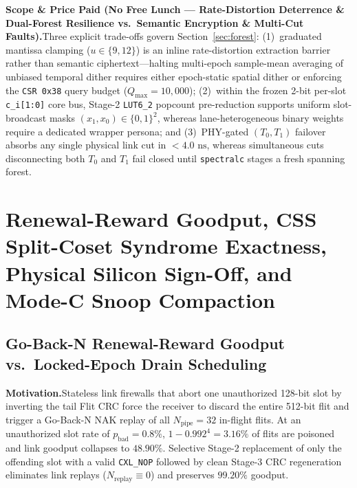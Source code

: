\documentclass[11pt,letterpaper]{article}
\theoremstyle{spectralthm}
\begin{document}
\noindent\textbf{Scope \& Price Paid (No Free Lunch --- Rate-Distortion Deterrence \& Dual-Forest Resilience vs.\ Semantic Encryption \& Multi-Cut Faults).}\;Three explicit trade-offs govern Section~\ref{sec:forest}: (1)~graduated mantissa clamping ($u \in \{9,12\}$) is an inline rate-distortion extraction barrier rather than semantic ciphertext---halting multi-epoch sample-mean averaging of unbiased temporal dither requires either epoch-static spatial dither or enforcing the \texttt{CSR 0x38} query budget ($Q_{\max} = 10,000$); (2)~within the frozen 2-bit per-slot \texttt{c\_i[1:0]} core bus, Stage-2 \mbox{\texttt{LUT6\_2}} popcount pre-reduction supports uniform slot-broadcast masks $(x_1,x_0) \in \{0,1\}^2$, whereas lane-heterogeneous binary weights require a dedicated wrapper persona; and (3)~PHY-gated $(T_0,T_1)$ failover absorbs any single physical link cut in $<4.0\text{~ns}$, whereas simultaneous cuts disconnecting both $T_0$ and $T_1$ fail closed until \texttt{spectralc} stages a fresh spanning forest.

\section{Renewal-Reward Goodput, CSS Split-Coset Syndrome Exactness, Physical Silicon Sign-Off, and Mode-C Snoop Compaction}
\label{sec:pipeline}

\subsection{Go-Back-N Renewal-Reward Goodput vs.\ Locked-Epoch Drain Scheduling}
\label{sec:goodput}
\noindent\textbf{Motivation.}\;Stateless link firewalls that abort one unauthorized 128-bit slot by inverting the tail Flit CRC force the receiver to discard the entire 512-bit flit and trigger a Go-Back-N NAK replay of all $N_{\mathrm{pipe}} = 32$ in-flight flits. At an unauthorized slot rate of $p_{\mathrm{bad}} = 0.8\%$, $1 - 0.992^4 = 3.16\%$ of flits are poisoned and link goodput collapses to $48.90\%$. Selective Stage-2 replacement of only the offending slot with a valid \texttt{CXL\_NOP} followed by clean Stage-3 CRC regeneration eliminates link replays ($N_{\mathrm{replay}} \equiv 0$) and preserves $99.20\%$ goodput.\par\smallskip
\end{document}
